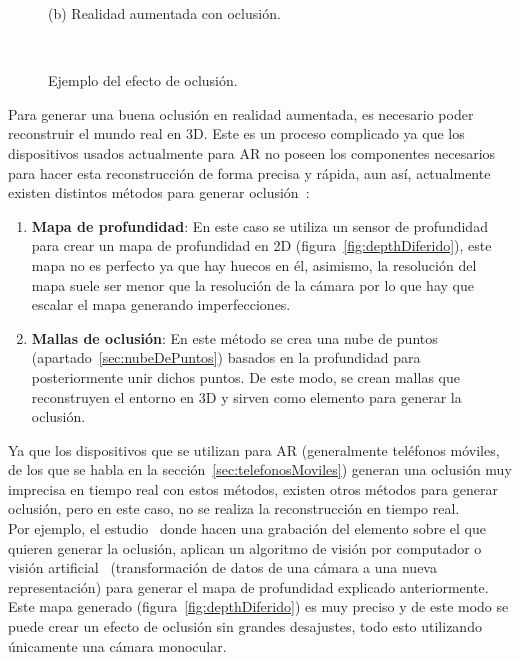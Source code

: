 \begin{figure}[H]
\begin{minipage}{0.5\textwidth}
        (b) Realidad aumentada con oclusión.
    \end{minipage}\\
    \caption[Ejemplo del efecto de oclusión.]{Ejemplo del efecto de oclusión\footnotemark.}
    \label{fig:arcoreOclusionExample}
\end{figure}

Para generar una buena oclusión en realidad aumentada, es necesario poder reconstruir el mundo real en 3D. Este es un proceso complicado ya que los dispositivos usados actualmente para AR no poseen los componentes necesarios para hacer esta reconstrucción de forma precisa y rápida, aun así, actualmente existen distintos métodos para generar oclusión~\cite{oclusionMethods}:

\begin{enumerate}
    \item \textbf{Mapa de profundidad}: En este caso se utiliza un sensor de profundidad para crear un mapa de profundidad en 2D (figura~\ref{fig:depthDiferido}), este mapa no es perfecto ya que hay huecos en él, asimismo, la resolución del mapa suele ser menor que la resolución de la cámara por lo que hay que escalar el mapa generando imperfecciones.
    
    \item \textbf{Mallas de oclusión}: En este método se crea una nube de puntos (apartado~\ref{sec:nubeDePuntos}) basados en la profundidad para posteriormente unir dichos puntos. De este modo, se crean mallas que reconstruyen el entorno en 3D y sirven como elemento para generar la oclusión.
\end{enumerate}

Ya que los dispositivos que se utilizan para AR (generalmente teléfonos móviles, de los que se habla en la sección~\ref{sec:telefonosMoviles}) generan una oclusión muy imprecisa en tiempo real con estos métodos, existen otros métodos para generar oclusión, pero en este caso, no se realiza la reconstrucción en tiempo real.\\



Por ejemplo, el estudio~\cite{oclusionEnDiferido} donde hacen una grabación del elemento sobre el que quieren generar la oclusión, aplican un algoritmo de visión por computador o visión artificial~\cite{visionporcomputador} (transformación de datos de una cámara a una nueva representación) para generar el mapa de profundidad explicado anteriormente. Este mapa generado (figura~\ref{fig:depthDiferido}) es muy preciso y de este modo se puede crear un efecto de oclusión sin grandes desajustes, todo esto utilizando únicamente una cámara monocular.\\

